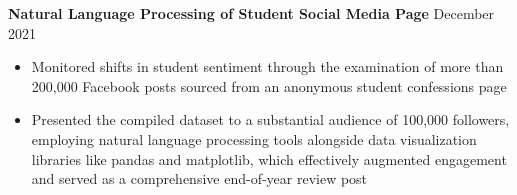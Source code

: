 \documentclass{article}
\begin{document}

\textbf{Natural Language Processing of Student Social Media Page} \hfill December 2021
\begin{itemize}
    \item Monitored shifts in student sentiment through the examination of more than 200,000 Facebook posts sourced from an anonymous student confessions page
    \item Presented the compiled dataset to a substantial audience of 100,000 followers, employing natural language processing tools alongside data visualization libraries like pandas and matplotlib, which effectively augmented engagement and served as a comprehensive end-of-year review post
\end{itemize} \medskip

\end{document}
